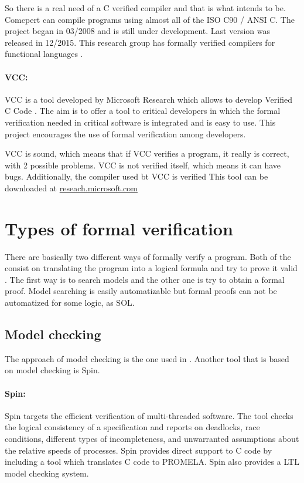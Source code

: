 So there is a real need of a C verified compiler and that is what  intends to be. 
%
Comcpert can compile programs using almost all of the ISO C90 / ANSI C.
%
The project began in 03/2008 and is still under development. Last version was released in 12/2015.
%
This research group has formally verified compilers for functional languages \cite{Dargaye-these}.


\paragraph{VCC:}
\gls{VCC} is a tool developed by Microsoft Research which allows to develop Verified C Code \cite{VCC}. 
%
The aim is to offer a tool to critical developers in which the formal verification needed in critical software is integrated and is easy to use.
%
This project encourages the use of formal verification among developers.

VCC is sound, which means that if VCC verifies a program, it really is correct, with 2 possible problems.
%
VCC is not verified itself, which means it can have bugs.
%
Additionally, the compiler used bt \gls{VCC} is verified 
%
This tool can be downloaded at \href{http://research.microsoft.com/en-us/projects/vcc/}{reseach.microsoft.com}



\section{Types of formal verification}

There are basically two different ways of formally verify a program. 
%
Both of the consist on translating the program into a logical formula and try to prove it valid \cite{ScalableTechniques}.
%
The first way is to search models and the other one is try to obtain a formal proof. 
%
Model searching is easily automatizable but formal proofs can not be automatized for some logic, as \gls{SOL}.


\subsection{Model checking}

The approach of model checking is the one used in . 
%
Another tool that is based on model checking is Spin.

\paragraph{Spin:}
Spin targets the efficient verification of multi-threaded software. 
%
The tool checks the logical consistency of a specification and reports on deadlocks, race conditions, different types of incompleteness, and unwarranted assumptions about the relative speeds of processes.
%
Spin provides direct support to C code by including a tool which translates C code to \gls{PROMELA}.
%
Spin also provides a \gls{LTL} model checking system.


